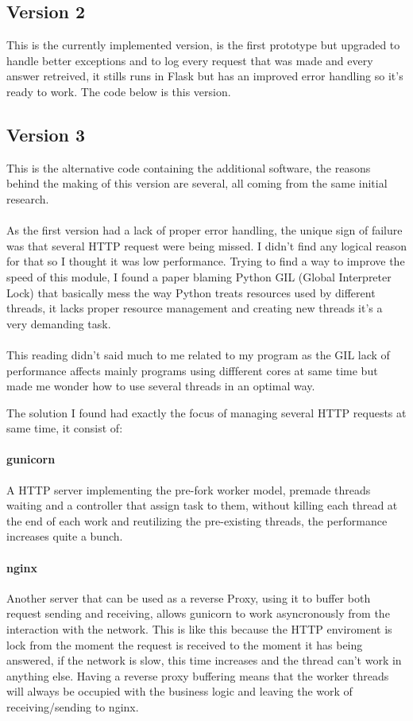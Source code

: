 \documentclass{article}
\begin{document}
\subsection{Version 2}
This is the currently implemented version, is the first prototype but upgraded to handle better exceptions and to log every request that was made and every answer retreived, it stills runs in Flask but has an improved error handling so it's ready to work. The code below is this version.

\subsection{Version 3}
This is the alternative code containing the additional software, the reasons behind the making of this version are several, all coming from the same initial research.

\paragraph{}
As the first version had a lack of proper error handling, the unique sign of failure was that several HTTP request were being missed.
I didn't find any logical reason for that so I thought it was low performance. Trying to find a way to improve the speed of this module, I found a paper blaming Python GIL (Global Interpreter Lock) that basically mess the way Python treats resources used by different threads, it lacks proper resource management and creating new threads it's a very demanding task.

\paragraph{}This reading didn't said much to me related to my program as the GIL lack of performance affects mainly programs using diffferent cores at same time but made me wonder how to use several threads in an optimal way.

The solution I found had exactly the focus of managing several HTTP requests at same time, it consist of:
\paragraph{gunicorn}
A HTTP server implementing the pre-fork worker model, premade threads waiting and a controller that assign task to them, without killing each thread at the end of each work and reutilizing the pre-existing threads, the performance increases quite a bunch.
\paragraph{nginx}
Another server that can be used as a reverse Proxy, using it to buffer both request sending and receiving, allows gunicorn to work asyncronously from the interaction with the network. This is like this because the HTTP enviroment is lock from the moment the request is received to the moment it has being answered, if the network is slow, this time increases and the thread can't work in anything else.
Having a reverse proxy buffering means that the worker threads will always be occupied with the business logic and leaving the work of receiving/sending to nginx.
\end{document}
